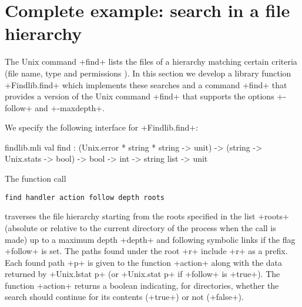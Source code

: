 \section{\label{ex/find}Complete example: search in a file hierarchy}

The Unix command \ml+find+ lists the files of a hierarchy matching
certain criteria (file name, type and permissions \etc). In this
section we develop a library function \ml+Findlib.find+ which
implements these searches and a command \ml+find+ that provides a version
of the Unix command \ml+find+ that supports the options \ml+-follow+
and \ml+-maxdepth+.

We specify the following interface for \ml+Findlib.find+:
%
\begin{listingcodefile}{findlib.mli}
val find : 
  (Unix.error * string * string -> unit) -> 
  (string -> Unix.stats -> bool) -> bool -> int -> string list -> 
  unit
\end{listingcodefile}
%
The function call
\begin{lstlisting}
find handler action follow depth roots
\end{lstlisting}
traverses the file hierarchy starting from the roots specified in the
list \ml+roots+ (absolute or relative to the current directory of the
process when the call is made) up to a maximum depth \ml+depth+ and following
symbolic links if the flag \ml+follow+ is set.  The paths found under
the root \ml+r+ include \ml+r+ as a prefix.  Each found path \ml+p+ is
given to the function \ml+action+ along with the data returned by
\ml+Unix.lstat p+ (or \ml+Unix.stat p+ if \ml+follow+ is \ml+true+).
The function \ml+action+ returns a boolean indicating, for
directories, whether the search should continue for its contents (\ml+true+)
or not (\ml+false+).

